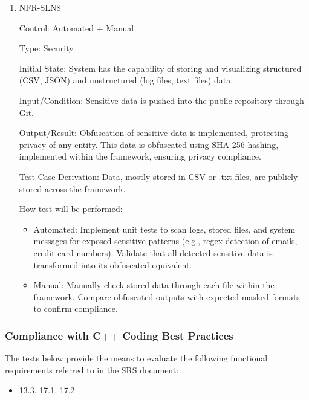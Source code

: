 \documentclass[12pt, titlepage]{article}
\begin{document}
\begin{enumerate}
\item NFR-SLN8

Control: Automated + Manual

Type: Security

Initial State: System has the capability of storing and visualizing structured (CSV, JSON) and unstructured (log files, text files) data.

Input/Condition: Sensitive data is pushed into the public repository through Git.

Output/Result: Obfuscation of sensitive data is implemented, protecting privacy of any entity. This data is obfuscated using SHA-256 hashing, implemented within the framework, ensuring privacy compliance.

Test Case Derivation: Data, mostly stored in CSV or .txt files, are publicly stored across the framework.

How test will be performed:
\begin{itemize}
  \item Automated: Implement unit tests to scan logs, stored files, and system messages for exposed sensitive patterns (e.g., regex detection of emails, credit card numbers). Validate that all detected sensitive data is transformed into its obfuscated equivalent.
  \item Manual: Manually check stored data through each file within the framework. Compare obfuscated outputs with expected masked formats to confirm compliance.
\end{itemize}

\end{enumerate}

\subsubsection{Compliance with C++ Coding Best Practices}

The tests below provide the means to evaluate the following functional requirements referred to in the SRS document:
\begin{itemize}
  \item 13.3, 17.1, 17.2
\end{itemize}
\end{document}

